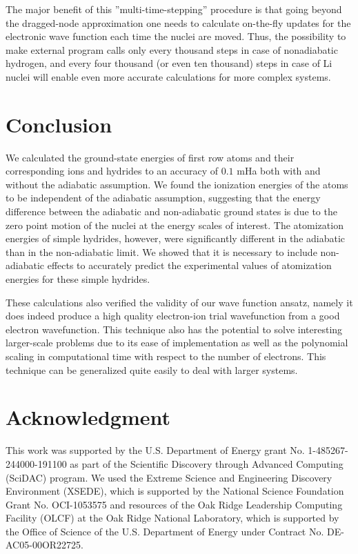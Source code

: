\documentclass[pra,superscriptaddress,groupedaddress,twocolumn]{revtex4}
\begin{document}
The major benefit of this ''multi-time-stepping'' procedure is that going beyond the dragged-node approximation one needs to calculate on-the-fly updates for the electronic wave function each time the nuclei are moved. Thus, the possibility to make external program calls only every thousand steps in case of nonadiabatic hydrogen, and every four thousand (or even ten thousand) steps in case of Li nuclei will enable even more accurate calculations for more complex systems.


\section{Conclusion}
We calculated the ground-state energies of first row atoms and their corresponding ions and hydrides to an accuracy of $0.1$ mHa both with and without the adiabatic assumption. We found the ionization energies of the atoms to be independent of the adiabatic assumption, suggesting that the energy difference between the adiabatic and non-adiabatic ground states is due to the zero point motion of the nuclei at the energy scales of interest. The atomization energies of simple hydrides, however, were significantly different in the adiabatic than in the non-adiabatic limit.   We showed that it is necessary to include non-adiabatic effects to accurately predict the experimental values of atomization energies for these simple hydrides.

These calculations also verified the validity of our wave function ansatz, namely it does indeed produce a high quality electron-ion trial wavefunction from a good electron wavefunction. This technique also has the potential to solve interesting larger-scale problems due to its ease of implementation as well as the polynomial scaling in computational time with respect to the number of electrons.  This technique can be generalized quite easily to deal with larger systems. %

\section{Acknowledgment}
This work was supported by the U.S. Department of Energy grant No. 1-485267-244000-191100 as part of the Scientific Discovery through Advanced Computing (SciDAC) program. We used the Extreme Science and Engineering Discovery Environment (XSEDE), which is supported by the National Science Foundation Grant No. OCI-1053575 and resources of the Oak Ridge Leadership Computing Facility (OLCF) at the Oak Ridge National Laboratory, which is supported by the Office of Science of the U.S. Department of Energy under Contract No. DE-AC05-00OR22725.



\end{document}
